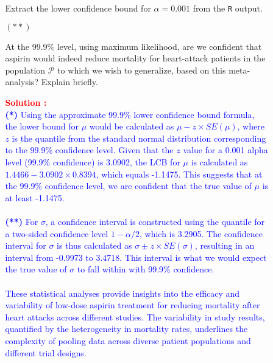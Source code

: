 \documentclass[12pt]{article}
\renewcommand{\t}[1]{\texttt{#1}}
\begin{document}
\begin{itemize}
\begin{itemize}
\begin{itemize}
Extract the lower confidence bound for $\alpha = 0.001$ from the \t{R} output. \textit{\fbox{\textbf{[10 points]}}} \vspace*{0.025in} 

\item[$( ** )$]

At the 99.9\% level, using maximum likelihood, are we confident that aspirin would indeed reduce mortality for heart-attack patients in the population $\mathcal{ P }$ to which we wish to generalize, based on this meta-analysis? Explain briefly. \textit{\fbox{\textbf{[10 points]}}}

\textcolor{red}{\textbf{Solution :}} \\
\textcolor{blue}{    
\textbf{(*)}  Using the approximate 99.9\% lower confidence bound formula, the lower bound for \(\mu\) would be calculated as \(\mu - z \times SE(\mu)\), where \(z\) is the quantile from the standard normal distribution corresponding to the 99.9\% confidence level. Given that the \(z\) value for a 0.001 alpha level (99.9\% confidence) is 3.0902, the LCB for \(\mu\) is calculated as \(1.4466 - 3.0902 \times 0.8394\), which equals -1.1475. This suggests that at the 99.9\% confidence level, we are confident that the true value of \(\mu\) is at least -1.1475.
\\ \\ 
\textbf{(**)} For \(\sigma\), a confidence interval is constructed using the quantile for a two-sided confidence level \(1 - \alpha/2\), which is 3.2905. The confidence interval for \(\sigma\) is thus calculated as \(\sigma \pm z \times SE(\sigma)\), resulting in an interval from -0.9973 to 3.4718. This interval is what we would expect the true value of \(\sigma\) to fall within with 99.9\% confidence.
\\ \\
These statistical analyses provide insights into the efficacy and variability of low-dose aspirin treatment for reducing mortality after heart attacks across different studies. The variability in study results, quantified by the heterogeneity in mortality rates, underlines the complexity of pooling data across diverse patient populations and different trial designs.
}

\end{itemize}

\end{itemize}

\end{itemize}
\end{document}
